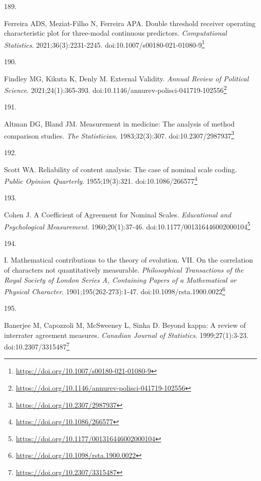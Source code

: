 \documentclass[
  a4paper,
]{book}
\newlength{\cslhangindent}
\newlength{\csllabelwidth}
\newlength{\cslentryspacingunit} %
\newenvironment{CSLReferences}[2] %
 {%
  \setlength{\parindent}{0pt}
  \ifodd #1
  \let\oldpar\par
  \def\par{\hangindent=\cslhangindent\oldpar}
  \fi
  \setlength{\parskip}{#2\cslentryspacingunit}
 }%
 {}
\newcommand{\CSLLeftMargin}[1]{\parbox[t]{\csllabelwidth}{#1}}
\newcommand{\CSLRightInline}[1]{\parbox[t]{\linewidth - \csllabelwidth}{#1}\break}
\renewcommand{\href}[2]{#2\footnote{\url{#1}}}
\begin{document}
\begin{CSLReferences}{0}{0}
\leavevmode{}%
\CSLLeftMargin{189. }%
\CSLRightInline{Ferreira ADS, Meziat-Filho N, Ferreira APA. Double threshold receiver operating characteristic plot for three-modal continuous predictors. \emph{Computational Statistics}. 2021;36(3):2231-2245. doi:\href{https://doi.org/10.1007/s00180-021-01080-9}{10.1007/s00180-021-01080-9}}

\leavevmode{}%
\CSLLeftMargin{190. }%
\CSLRightInline{Findley MG, Kikuta K, Denly M. External Validity. \emph{Annual Review of Political Science}. 2021;24(1):365-393. doi:\href{https://doi.org/10.1146/annurev-polisci-041719-102556}{10.1146/annurev-polisci-041719-102556}}

\leavevmode{}%
\CSLLeftMargin{191. }%
\CSLRightInline{Altman DG, Bland JM. Measurement in medicine: The analysis of method comparison studies. \emph{The Statistician}. 1983;32(3):307. doi:\href{https://doi.org/10.2307/2987937}{10.2307/2987937}}

\leavevmode{}%
\CSLLeftMargin{192. }%
\CSLRightInline{Scott WA. Reliability of content analysis: The case of nominal scale coding. \emph{Public Opinion Quarterly}. 1955;19(3):321. doi:\href{https://doi.org/10.1086/266577}{10.1086/266577}}

\leavevmode{}%
\CSLLeftMargin{193. }%
\CSLRightInline{Cohen J. A Coefficient of Agreement for Nominal Scales. \emph{Educational and Psychological Measurement}. 1960;20(1):37-46. doi:\href{https://doi.org/10.1177/001316446002000104}{10.1177/001316446002000104}}

\leavevmode{}%
\CSLLeftMargin{194. }%
\CSLRightInline{I. Mathematical contributions to the theory of evolution. {\textemdash}VII. On the correlation of characters not quantitatively measurable. \emph{Philosophical Transactions of the Royal Society of London Series A, Containing Papers of a Mathematical or Physical Character}. 1901;195(262-273):1-47. doi:\href{https://doi.org/10.1098/rsta.1900.0022}{10.1098/rsta.1900.0022}}

\leavevmode{}%
\CSLLeftMargin{195. }%
\CSLRightInline{Banerjee M, Capozzoli M, McSweeney L, Sinha D. Beyond kappa: A review of interrater agreement measures. \emph{Canadian Journal of Statistics}. 1999;27(1):3-23. doi:\href{https://doi.org/10.2307/3315487}{10.2307/3315487}}


\end{CSLReferences}
\end{document}
